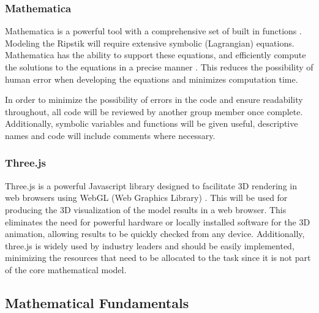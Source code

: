 \subsubsection{Mathematica}

Mathematica is a powerful tool with a comprehensive set of built in functions \cite{Wolfram}. Modeling the Ripstik will require extensive symbolic (Lagrangian) equations. Mathematica has the ability to support these equations, and efficiently compute the solutions to the equations in a precise manner \cite{Wolfram}. This reduces the possibility of human error when developing the equations and minimizes computation time.

In order to minimize the possibility of errors in the code and ensure readability throughout, all code will be reviewed by another group member once complete. Additionally, symbolic variables and functions will be given useful, descriptive names and code will include comments where necessary.
\subsubsection{Three.js}
Three.js is a powerful Javascript library designed to facilitate 3D rendering in web browsers using WebGL (Web Graphics Library) \cite{threejs}. This will be used for producing the 3D visualization of the model results in a web browser. This eliminates the need for powerful hardware or locally installed software for the 3D animation, allowing results to be quickly checked from any device. Additionally, three.js is widely used by industry leaders \cite{threejs} and should be easily implemented, minimizing the resources that need to be allocated to the task since it is not part of the core mathematical model.

\subsection{Mathematical Fundamentals} \label{solutionMath}


